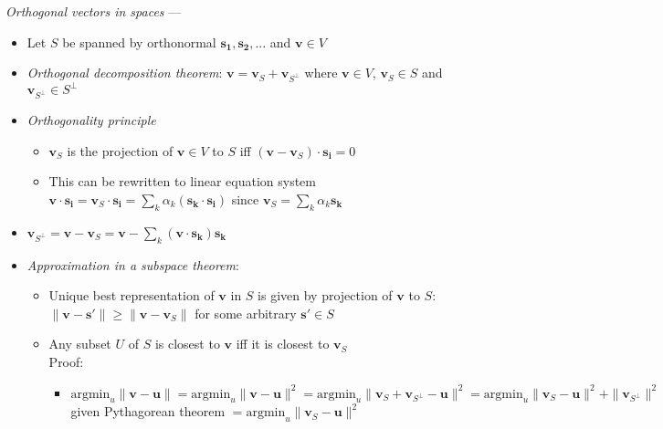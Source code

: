 \emph{Orthogonal vectors in spaces} --- 
\begin{itemize}
    \item Let $S$ be spanned by orthonormal $\boldsymbol{s_1},\boldsymbol{s_2},...$ and $\boldsymbol{v} \in V$
    \item \emph{Orthogonal decomposition theorem}: $\boldsymbol{v} = \boldsymbol{v}_{S} + \boldsymbol{v}_{S^\bot}$ where $\boldsymbol{v} \in V$, $\boldsymbol{v}_{S} \in S$ and $\boldsymbol{v}_{S^\bot} \in S^\bot$
    \item \emph{Orthogonality principle}
    \begin{itemize}
        \item $\boldsymbol{v}_{S}$ is the projection of $\boldsymbol{v} \in V$ to $S$ iff $(\boldsymbol{v}-\boldsymbol{v}_{S}) \cdot \boldsymbol{s_i} = 0$
        \item This can be rewritten to linear equation system $\boldsymbol{v} \cdot \boldsymbol{s_i} = \boldsymbol{v}_{S} \cdot \boldsymbol{s_i} = \sum_k \alpha_k (\boldsymbol{s_k} \cdot \boldsymbol{s_i})$ since $\boldsymbol{v}_{S} = \sum_k \alpha_k \boldsymbol{s_k}$
    \end{itemize}
    \item $\boldsymbol{v}_{S^\bot} = \boldsymbol{v} - \boldsymbol{v}_{S} = \boldsymbol{v} - \sum_k (\boldsymbol{v} \cdot \boldsymbol{s_k}) \boldsymbol{s_k}$ 
    \item \emph{Approximation in a subspace theorem}: 
    \begin{itemize}
        \item Unique best representation of $\boldsymbol{v}$ in $S$ is given by projection of $\boldsymbol{v}$ to $S$: $\|\boldsymbol{v} - \boldsymbol{s'}\| \geq \|\boldsymbol{v} - \boldsymbol{v}_S\|$ for some arbitrary $\boldsymbol{s'} \in S$
        \item Any subset $U$ of $S$ is closest to $\boldsymbol{v}$  iff it is closest to $\boldsymbol{v}_S$\\
        Proof:
        \begin{itemize}
            \item $\textrm{argmin}_u \| \boldsymbol{v} - \boldsymbol{u} \| = \textrm{argmin}_u \| \boldsymbol{v} - \boldsymbol{u} \|^2 = \textrm{argmin}_u \| \boldsymbol{v}_S + \boldsymbol{v}_{S^\bot} - \boldsymbol{u} \|^2 = \textrm{argmin}_u \| \boldsymbol{v}_S - \boldsymbol{u}\|^2 + \|\boldsymbol{v}_{S^\bot}\|^2$ given Pythagorean theorem $ = \textrm{argmin}_u \| \boldsymbol{v}_S - \boldsymbol{u}\|^2$
        \end{itemize}
    \end{itemize}
\end{itemize}

